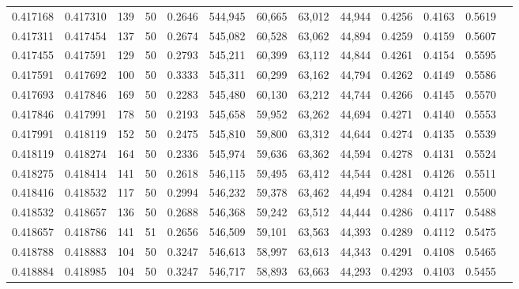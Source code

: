 \begin{tabular}{rrrrrrrrrrrrr}
0.417168 & 0.417310 &   139 &  50 &                                     0.2646 & 544,945 &  60,665 &  63,012 &  44,944 & 0.4256 & 0.4163 & 0.5619 \\
0.417311 & 0.417454 &   137 &  50 &                                     0.2674 & 545,082 &  60,528 &  63,062 &  44,894 & 0.4259 & 0.4159 & 0.5607 \\
0.417455 & 0.417591 &   129 &  50 &                                     0.2793 & 545,211 &  60,399 &  63,112 &  44,844 & 0.4261 & 0.4154 & 0.5595 \\
0.417591 & 0.417692 &   100 &  50 &                                     0.3333 & 545,311 &  60,299 &  63,162 &  44,794 & 0.4262 & 0.4149 & 0.5586 \\
0.417693 & 0.417846 &   169 &  50 &                                     0.2283 & 545,480 &  60,130 &  63,212 &  44,744 & 0.4266 & 0.4145 & 0.5570 \\
0.417846 & 0.417991 &   178 &  50 &                                     0.2193 & 545,658 &  59,952 &  63,262 &  44,694 & 0.4271 & 0.4140 & 0.5553 \\
0.417991 & 0.418119 &   152 &  50 &                                     0.2475 & 545,810 &  59,800 &  63,312 &  44,644 & 0.4274 & 0.4135 & 0.5539 \\
0.418119 & 0.418274 &   164 &  50 &                                     0.2336 & 545,974 &  59,636 &  63,362 &  44,594 & 0.4278 & 0.4131 & 0.5524 \\
0.418275 & 0.418414 &   141 &  50 &                                     0.2618 & 546,115 &  59,495 &  63,412 &  44,544 & 0.4281 & 0.4126 & 0.5511 \\
0.418416 & 0.418532 &   117 &  50 &                                     0.2994 & 546,232 &  59,378 &  63,462 &  44,494 & 0.4284 & 0.4121 & 0.5500 \\
0.418532 & 0.418657 &   136 &  50 &                                     0.2688 & 546,368 &  59,242 &  63,512 &  44,444 & 0.4286 & 0.4117 & 0.5488 \\
0.418657 & 0.418786 &   141 &  51 &                                     0.2656 & 546,509 &  59,101 &  63,563 &  44,393 & 0.4289 & 0.4112 & 0.5475 \\
0.418788 & 0.418883 &   104 &  50 &                                     0.3247 & 546,613 &  58,997 &  63,613 &  44,343 & 0.4291 & 0.4108 & 0.5465 \\
0.418884 & 0.418985 &   104 &  50 &                                     0.3247 & 546,717 &  58,893 &  63,663 &  44,293 & 0.4293 & 0.4103 & 0.5455 \\

\end{tabular}
